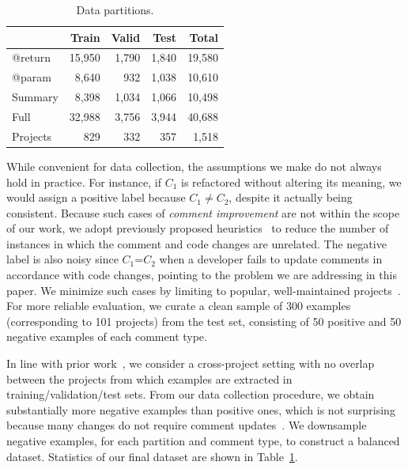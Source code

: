 \documentclass[letterpaper]{article} %
\newcommand{\CommentA}{$C_{1}$}
\newcommand{\CommentB}{$C_{2}$}
\begin{document}
\begin{table}
\centering
\small
\begin{tabular}{l@{\hskip 3mm}rrrr}
\hline
&  \bf Train & \bf Valid & \bf Test & \bf Total\\
\hline
@return & 15,950 & 1,790 & 1,840 & 19,580\\
@param & 8,640 & 932 & 1,038 & 10,610\\
Summary & 8,398 &  1,034 & 1,066 & 10,498\\
\hline
Full & 32,988 & 3,756 & 3,944 & 40,688\\
\hline
Projects & 829 & 332 & 357 & 1,518\\
\hline
\end{tabular}
\vspace{-5pt}
\caption{\label{table:data-splits}Data partitions.}
\end{table}



While convenient for data collection, the assumptions we make do not always hold in practice. For instance, if \CommentA{} is refactored without altering its meaning, we would assign a positive label because \CommentA{}$\neq$\CommentB{}, despite it actually being consistent. Because such cases of \textit{comment improvement} are not within the scope of our work, we adopt previously proposed heuristics~\cite{panthaplackel2020update} to reduce the number of instances in which the comment and code changes are unrelated. The negative label is also noisy since \CommentA{}=\CommentB{} when a developer fails to update comments in accordance with code changes, pointing to the problem we are addressing in this paper. We minimize such cases by limiting to popular, well-maintained projects~\cite{ProjectQuality}. For more reliable evaluation, we curate a clean sample of 300 examples
(corresponding to 101 projects) from the test set, consisting of 50 positive and 50 negative examples of each comment type.


In line with prior work~\cite{RenCrossProject,Movshovitz-AttiasCohen13PredictingProgrammingComments}, we consider a cross-project setting with no overlap between the projects from which examples are extracted in training/validation/test sets. From our data collection procedure, we obtain substantially more negative examples than positive ones, which is not surprising because many changes do not require comment updates~\cite{WenLargeStudy}. We downsample negative examples, for each partition and comment type, to construct a balanced dataset.
Statistics of our final dataset are shown in Table~\ref{table:data-splits}.
\end{document}

